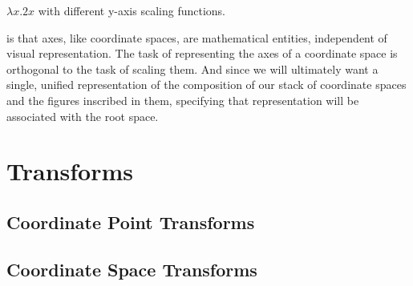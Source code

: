 \documentclass{tufte-handout}
\numberwithin{equation}{subsection}
\begin{document}
\begin{marginfigure}[12pt]%
\hspace{8pt}
\vspace{12pt}
\caption{$\lambda x.2x$ with different y-axis scaling functions.}
\label{fig:yscaling}
\end{marginfigure}%

 is that axes, like coordinate
spaces, are mathematical entities, independent of visual
representation.  The task of representing the axes of a coordinate
space is orthogonal to the task of scaling them.  And since we will
ultimately want a single, unified representation of the composition of
our stack of coordinate spaces and the figures inscribed in them,
specifying that representation will be associated with the root
space.

\section{Transforms}
\label{sec:transforms}

\subsection{Coordinate Point Transforms}

\subsection{Coordinate Space Transforms}
\end{document}
